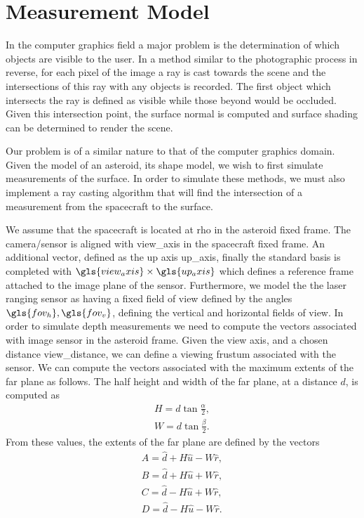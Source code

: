 \section{Measurement Model}

In the computer graphics field a major problem is the determination of which objects are visible to the user.
In a method similar to the photographic process in reverse, for each pixel of the image a ray is cast towards the scene and the intersections of this ray with any objects is recorded.
The first object which intersects the ray is defined as visible while those beyond would be occluded.
Given this intersection point, the surface normal is computed and surface shading can be determined to render the scene.

Our problem is of a similar nature to that of the computer graphics domain.
Given the model of an asteroid, its shape model, we wish to first simulate measurements of the surface. 
In order to simulate these methods, we must also implement a ray casting algorithm that will find the intersection of a measurement from the spacecraft to the surface. 

We assume that the spacecraft is located at \gls{rho} in the asteroid fixed frame.
The camera/sensor is aligned with \gls{view_axis} in the spacecraft fixed frame.
An additional vector, defined as the up axis \gls{up_axis}, finally the standard basis is completed with \( \gls{view_axis} \times \gls{up_axis} \) which defines a reference frame attached to the image plane of the sensor.
Furthermore, we model the the laser ranging sensor as having a fixed field of view defined by the angles \( \gls{fov_h}, \gls{fov_v}\), defining the vertical and horizontal fields of view.
In order to simulate depth measurements we need to compute the vectors associated with image sensor in the asteroid frame. 
Given the view axis, and a chosen distance \gls{view_distance}, we can define a viewing \gls{frustum} associated with the sensor. 
We can compute the vectors associated with the maximum extents of the far plane as follows.
The half height and width of the far plane, at a distance \( d \), is computed as
\begin{align}
    H = d \tan \frac{\alpha}{2} , \\
    W = d \tan \frac{\beta}{2} .
\end{align}
From these values, the extents of the far plane are defined by the vectors
\begin{align}
    A = \hat d + H \hat u - W \hat r , \\
    B = \hat d + H \hat u + W \hat r, \\
    C = \hat d - H \hat  u + W \hat r, \\
    D = \hat d - H \hat u - W \hat r.
\end{align}

